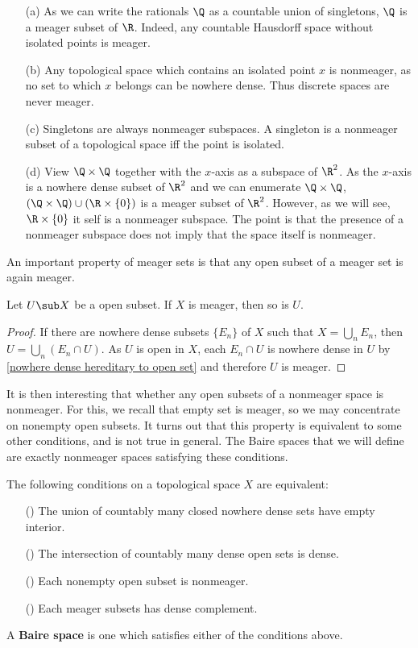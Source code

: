 \begin{example}
\mbox{}
\begin{itemize}
\item[(a)] As we can write the rationals $\Q$ as a countable union of singletons, $\Q$ is a meager subset of $\R$. Indeed, any countable Hausdorff space without isolated points is meager.
\item[(b)] Any topological space which contains an isolated point $x$ is nonmeager, as no set to which $x$ belongs can be nowhere dense. Thus discrete spaces are never meager.
\item[(c)] Singletons are always nonmeager subspaces. A singleton is a nonmeager subset of a topological space iff the point is isolated.
\item[(d)] View $\Q\times\Q$ together with the $x$-axis as a subspace of $\R^2$. As the $x$-axis is a nowhere dense subset of $\R^2$ and we can enumerate $\Q\times\Q$, $(\Q\times\Q)\cup(\R\times\{0\})$ is a meager subset of $\R^2$. However, as we will see, $\R\times\{0\}$ it self is a nonmeager subspace. The point is that the presence of a nonmeager subspace does not imply that the space itself is nonmeager.
\end{itemize}
\end{example}
An important property of meager sets is that any open subset of a meager set is again meager.
\begin{proposition}\label{meager open subset is meager}
Let $U\sub X$ be a open subset. If $X$ is meager, then so is $U$.
\end{proposition}
\begin{proof}
If there are nowhere dense subsets $\{E_n\}$ of $X$ such that $X=\bigcup_nE_n$, then $U=\bigcup_n(E_n\cap U)$. As $U$ is open in $X$, each $E_n\cap U$ is nowhere dense in $U$ by \cref{nowhere dense hereditary to open set} and therefore $U$ is meager.
\end{proof}
It is then interesting that whether any open subsets of a nonmeager space is nonmeager. For this, we recall that empty set is meager, so we may concentrate on nonempty open subsets. It turns out that this property is equivalent to some other conditions, and is not true in general. The Baire spaces that we will define are exactly nonmeager spaces satisfying these conditions.
\begin{theorem}\label{Baire space iff}
The following conditions on a topological space $X$ are equivalent:
\begin{itemize}
\item[(\rmnum{1})] The union of countably many closed nowhere dense sets have empty interior.
\item[(\rmnum{2})] The intersection of countably many dense open sets is dense.
\item[(\rmnum{3})] Each nonempty open subset is nonmeager.
\item[(\rmnum{4})] Each meager subsets has dense complement.
\end{itemize}
A \textbf{Baire space} is one which satisfies either of the conditions above.
\end{theorem}
